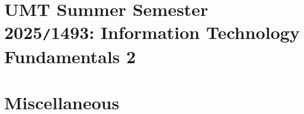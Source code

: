 \documentclass{article}
\begin{document}
\section{UMT Summer Semester 2025{\tt/}1493: Information Technology Fundamentals 2}


\section{Miscellaneous}


\printbibliography[heading=bibintoc]
	
\end{document}
